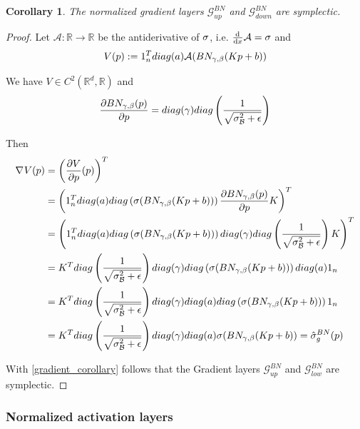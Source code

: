 \documentclass[twoside,a4paper]{article}
\newtheorem{corollary}{Corollary}
\begin{document}

\begin{corollary}
	The normalized gradient layers $\mathcal{G}^{BN}_{up}$ and $\mathcal{G}^{BN}_{down}$
	are symplectic.
\end{corollary}
\begin{proof}
	Let $\mathcal{A}: \mathbb{R} \to \mathbb{R}$ be the antiderivative of $\sigma$, 
	i.e. $\frac{\mathrm{d}^{}}{\mathrm{d}x} \mathcal{A} = \sigma$ and
	\begin{equation*}
		V(p) := 1_{n}^Tdiag(a)\mathcal{A}(BN_{\gamma, \beta}(Kp+b))
	\end{equation*}

	We have $V \in C^2(\mathbb{R}^d, \mathbb{R})$ and
	\begin{equation*}
		\frac{\partial BN_{\gamma, \beta}(p)}{\partial p} = 
		diag(\gamma)diag\left( \frac{1}{\sqrt{\sigma^2_\mathcal{B} + \epsilon}} \right)
	\end{equation*}

	Then
	\begin{align*}
		\nabla_{}{V(p)} &= \left(\frac{\partial V}{\partial p}(p)\right)^T \\
		&= \left( 1_n^T diag(a) diag \left( \sigma(BN_{\gamma, \beta}(Kp+b))\right)
		\frac{\partial BN_{\gamma, \beta}(p)}{\partial p} K \right)^T \\
		&= \left( 1_n^T diag(a) diag \left( \sigma(BN_{\gamma, \beta}(Kp+b))\right)
		diag(\gamma) diag\left( \frac{1}{\sqrt{\sigma^2_\mathcal{B} + \epsilon}} \right) K \right)^T \\
		&= K^T diag\left( \frac{1}{\sqrt{\sigma^2_\mathcal{B} + \epsilon}} \right) diag(\gamma)
		diag\left(\sigma(BN_{\gamma, \beta}(Kp+b))\right) diag(a) 1_n \\
		&= K^T diag\left( \frac{1}{\sqrt{\sigma^2_\mathcal{B} + \epsilon}} \right) diag(\gamma)
		diag(a) diag\left(\sigma(BN_{\gamma, \beta}(Kp+b))\right) 1_n \\
		&= K^T diag\left( \frac{1}{\sqrt{\sigma^2_\mathcal{B} + \epsilon}} \right) diag(\gamma)
		diag(a) \sigma(BN_{\gamma, \beta}(Kp+b)) = \hat{\sigma}^{BN}_g(p)
	\end{align*}

	With \cref{gradient_corollary} follows that the Gradient layers
	$\mathcal{G}^{BN}_{up}$ and $\mathcal{G}^{BN}_{low}$ are symplectic.
\end{proof}

\subsubsection{Normalized activation layers}
\end{document}
